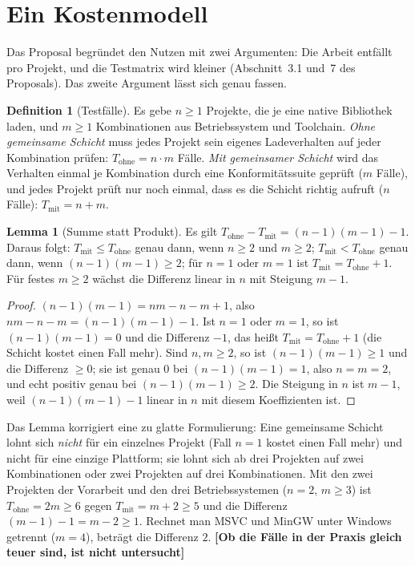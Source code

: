 \documentclass[a4paper,12pt,twoside]{report}
\DeclareRobustCommand{\_}{\ifmmode\mbox{\textunderscore}\else\textunderscore\allowbreak{}\fi}
\theoremstyle{definition}
\newtheorem{definition}{Definition}[chapter]
\newtheorem{lemma}{Lemma}[chapter]
\newcommand{\offen}[1]{\textcolor{accentred}{\textbf{[#1]}}}
\begin{document}
\section{Ein Kostenmodell}
\label{sec:kostenmodell}

Das Proposal begründet den Nutzen mit zwei Argumenten: Die Arbeit entfällt pro Projekt, und die Testmatrix wird kleiner (Abschnitt~3.1 und~7 des Proposals). Das zweite Argument lässt sich genau fassen.

\begin{definition}[Testfälle]
	Es gebe $n\ge1$ Projekte, die je eine native Bibliothek laden, und $m\ge1$ Kombinationen aus Betriebssystem und Toolchain. \emph{Ohne gemeinsame Schicht} muss jedes Projekt sein eigenes Ladeverhalten auf jeder Kombination prüfen: $T_{\mathrm{ohne}}=n\cdot m$ Fälle. \emph{Mit gemeinsamer Schicht} wird das Verhalten einmal je Kombination durch eine Konformitätssuite geprüft ($m$ Fälle), und jedes Projekt prüft nur noch einmal, dass es die Schicht richtig aufruft ($n$ Fälle): $T_{\mathrm{mit}}=n+m$.
\end{definition}

\begin{lemma}[Summe statt Produkt]
	\label{lem:matrix}
	Es gilt $T_{\mathrm{ohne}}-T_{\mathrm{mit}}=(n-1)(m-1)-1$. Daraus folgt: $T_{\mathrm{mit}}\le T_{\mathrm{ohne}}$ genau dann, wenn $n\ge2$ und $m\ge2$; $T_{\mathrm{mit}}<T_{\mathrm{ohne}}$ genau dann, wenn $(n-1)(m-1)\ge2$; für $n=1$ oder $m=1$ ist $T_{\mathrm{mit}}=T_{\mathrm{ohne}}+1$. Für festes $m\ge2$ wächst die Differenz linear in $n$ mit Steigung $m-1$.
\end{lemma}

\begin{proof}
	$(n-1)(m-1)=nm-n-m+1$, also $nm-n-m=(n-1)(m-1)-1$. Ist $n=1$ oder $m=1$, so ist $(n-1)(m-1)=0$ und die Differenz $-1$, das heißt $T_{\mathrm{mit}}=T_{\mathrm{ohne}}+1$ (die Schicht kostet einen Fall mehr). Sind $n,m\ge2$, so ist $(n-1)(m-1)\ge1$ und die Differenz $\ge0$; sie ist genau $0$ bei $(n-1)(m-1)=1$, also $n=m=2$, und echt positiv genau bei $(n-1)(m-1)\ge2$. Die Steigung in $n$ ist $m-1$, weil $(n-1)(m-1)-1$ linear in $n$ mit diesem Koeffizienten ist.
\end{proof}

Das Lemma korrigiert eine zu glatte Formulierung: Eine gemeinsame Schicht lohnt sich \emph{nicht} für ein einzelnes Projekt (Fall $n=1$ kostet einen Fall mehr) und nicht für eine einzige Plattform; sie lohnt sich ab drei Projekten auf zwei Kombinationen oder zwei Projekten auf drei Kombinationen. Mit den zwei Projekten der Vorarbeit und den drei Betriebssystemen ($n=2$, $m\ge3$) ist $T_{\mathrm{ohne}}=2m\ge6$ gegen $T_{\mathrm{mit}}=m+2\ge5$ und die Differenz $(m-1)-1=m-2\ge1$. Rechnet man MSVC und MinGW unter Windows getrennt ($m=4$), beträgt die Differenz $2$. \offen{Ob die Fälle in der Praxis gleich teuer sind, ist nicht untersucht}
\end{document}
